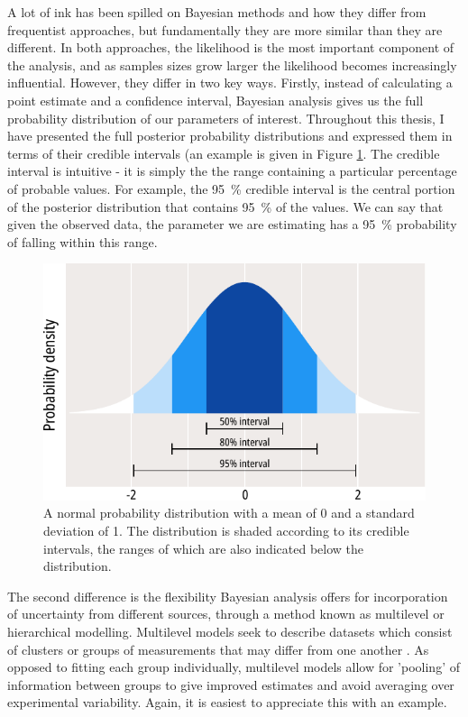 A lot of ink has been spilled on Bayesian methods and how they differ from frequentist approaches, but fundamentally they are more similar than they are different.
In both approaches, the likelihood is the most important component of the analysis, and as samples sizes grow larger the likelihood becomes increasingly influential.
However, they differ in two key ways.
Firstly, instead of calculating a point estimate and a confidence interval, Bayesian analysis gives us the full probability distribution of our parameters of interest.
Throughout this thesis, I have presented the full posterior probability distributions and expressed them in terms of their credible intervals (an example is given in Figure \ref{ch2fig:intervals}.
The credible interval is intuitive - it is simply the the range containing a particular percentage of probable values.
For example, the \SI{95}{\percent} credible interval is the central portion of the posterior distribution that contains \SI{95}{\percent} of the values.
We can say that given the observed data, the parameter we are estimating has a \SI{95}{\percent} probability of falling within this range.

\begin{figure}
	\centering
	\includegraphics[width=.75\textwidth]{intervals.pdf}
	\caption[Credible intervals of a probability distribution]{
		A normal probability distribution with a mean of 0 and a standard deviation of 1.
		The distribution is shaded according to its credible intervals, the ranges of which are also indicated below the distribution.
	}\label{ch2fig:intervals}
\end{figure}

The second difference is the flexibility Bayesian analysis offers for incorporation of uncertainty from different sources, through a method known as multilevel or hierarchical modelling.
Multilevel models seek to describe datasets which consist of clusters or groups of measurements that may differ from one another \cite{gelman_bayesian_2014, mcelreath_statistical_2020}.
As opposed to fitting each group individually, multilevel models allow for 'pooling' of information between groups to give improved estimates and avoid averaging over experimental variability.
Again, it is easiest to appreciate this with an example.

